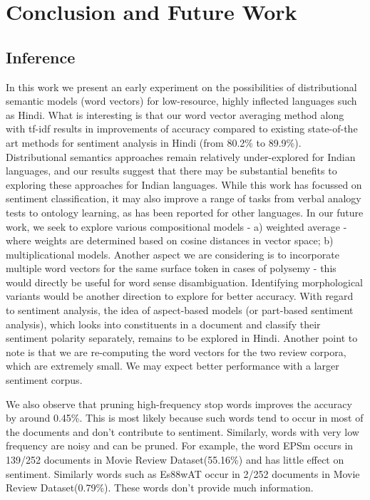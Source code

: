 \chapter{Conclusion and Future Work}
\section{Inference}
		In this work we present an early experiment on the possibilities of distributional semantic models (word vectors) for low-resource, highly inflected languages such as Hindi.  What is interesting is that our word vector averaging method along with tf-idf results in improvements of accuracy compared to existing state-of-the art methods for sentiment analysis in Hindi (from 80.2\% to 89.9\%).
Distributional semantics approaches remain relatively under-explored for Indian languages, and our results suggest that there may be substantial benefits to exploring these approaches for Indian languages.  While this work has focussed on sentiment classification, it may also improve a range of tasks from verbal analogy tests to ontology learning, as has been reported for other languages.
In our future work, we seek to explore various compositional models - a) weighted average - where weights are determined based on cosine distances in vector space;  b) multiplicational models. Another aspect we are considering is to incorporate multiple word vectors for the same surface token in cases of polysemy - this would directly be useful for word sense disambiguation.  Identifying morphological variants would be another direction to explore for better accuracy. With regard to sentiment analysis, the idea of aspect-based models (or part-based sentiment analysis), which looks into constituents in a document and classify their sentiment polarity separately, remains to be explored in Hindi. Another point to note is that we are re-computing the word vectors
for the two review corpora, which are extremely small.  We may expect better performance  with a larger sentiment corpus.

We also observe that pruning high-frequency stop words improves the accuracy by around 0.45\%. This is most likely  because such words tend to occur in most of the documents and don't contribute to sentiment.  Similarly, words with very low frequency are noisy and can be pruned. For example, the word {\dn EPSm} occurs in 139/252 documents in Movie Review Dataset(55.16\%) and has little effect on sentiment.
Similarly words such as {\dn Es\388wAT\0} occur in 2/252 documents in Movie Review Dataset(0.79\%). These words don't provide much information.\\ 

